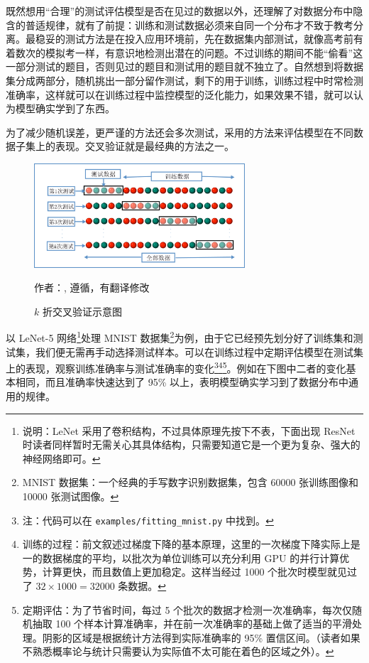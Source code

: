 既然想用“合理”的测试评估模型是否在见过的数据以外，还理解了对数据分布中隐含的普适规律，就有了前提：训练和测试数据必须来自同一个分布才不致于教考分离。最稳妥的测试方法是在投入应用环境前，先在数据集内部测试，就像高考前有着数次的模拟考一样，有意识地检测出潜在的问题。不过训练的期间不能“偷看”这一部分测试的题目，否则见过的题目和测试用的题目就不独立了。自然想到将数据集分成两部分，随机挑出一部分留作测试，剩下的用于训练，训练过程中时常检测准确率，这样就可以在训练过程中监控模型的泛化能力，如果效果不错，就可以认为模型确实学到了东西。

为了减少随机误差，更严谨的方法还会多次测试，采用的方法来评估模型在不同数据子集上的表现。交叉验证就是最经典的方法之一。

\begin{figure}[H]
    \centering
    \includegraphics[width=0.7\textwidth]{img/K-fold_cross_validation_ZH-CN.png}
    \caption{$k$ 折交叉验证示意图}
    作者：, 遵循，有翻译修改
    \label{fig:kfold-cross-validation}
\end{figure}

以 LeNet-5 网络\footnote{说明：LeNet 采用了卷积结构，不过具体原理先按下不表，下面出现 ResNet 时读者同样暂时无需关心其具体结构，只需要知道它是一个更为复杂、强大的神经网络即可。}处理 MNIST 数据集\footnote{MNIST 数据集：一个经典的手写数字识别数据集，包含 60000 张训练图像和 10000 张测试图像。}为例，由于它已经预先划分好了训练集和测试集，我们便无需再手动选择测试样本。可以在训练过程中定期评估模型在测试集上的表现，观察训练准确率与测试准确率的变化\footnote{注：代码可以在 \texttt{examples/fitting\_mnist.py} 中找到。}\;\footnote{训练的过程：前文叙述过梯度下降的基本原理，这里的一次梯度下降实际上是一的数据梯度的平均，以批次为单位训练可以充分利用 GPU 的并行计算优势，计算更快，而且数值上更加稳定。这样当经过 1000 个批次时模型就见过了 $32\times 1000 = 32000$ 条数据。}\;\footnote{定期评估：为了节省时间，每过 5 个批次的数据才检测一次准确率，每次仅随机抽取 100 个样本计算准确率，并在前一次准确率的基础上做了适当的平滑处理。阴影的区域是根据统计方法得到实际准确率的 95\% 置信区间。（读者如果不熟悉概率论与统计只需要认为实际值不太可能在着色的区域之外）。}。例如在下图中二者的变化基本相同，而且准确率快速达到了 95\% 以上，表明模型确实学习到了数据分布中通用的规律。

